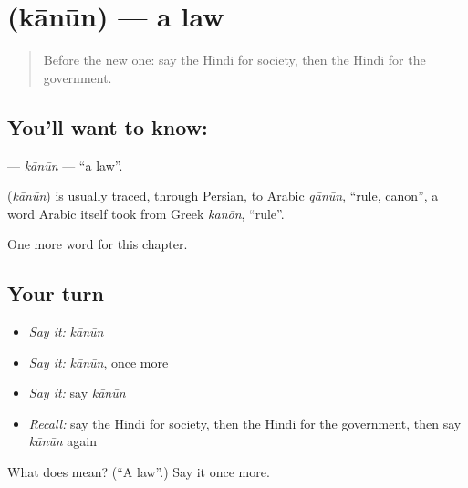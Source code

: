 \section[\texorpdfstring{\hi{क़ानून} (kānūn)}{क़ानून (kānūn)}]{ (kānūn) — a law}

\label{lesson:HI-C218-kanun}



\begin{quote}
Before the new one: say the Hindi for society, then the Hindi for the government.
\end{quote}

\subsection*{You'll want to know: }
\textbf{} — \emph{kānūn} — \textquotedblleft{}a law\textquotedblright{}.

\begin{cousinweb}
\textbf{} (\emph{kānūn}) is usually traced, through Persian, to Arabic \emph{qānūn}, \textquotedblleft{}rule, canon\textquotedblright{}, a word Arabic itself took from Greek \emph{kanōn}, \textquotedblleft{}rule\textquotedblright{}.
\end{cousinweb}

\begin{grammarlens}[title={What you've built}]
One more word for this chapter.
\end{grammarlens}

\subsection*{Your turn}
\begin{itemize}
\raggedright
  \item \emph{Say it:} \emph{kānūn}
  \item \emph{Say it:} \emph{kānūn}, once more
  \item \emph{Say it:} say \emph{kānūn}
  \item \emph{Recall:} say the Hindi for society, then the Hindi for the government, then say \emph{kānūn} again
\end{itemize}

\begin{tcolorbox}[breakable,colback=teal!4,colframe=teal!35!black,title={Before you move on}]
What does  mean? (\textquotedblleft{}A law\textquotedblright{}.) Say it once more.
\end{tcolorbox}

